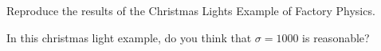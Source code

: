 \begin{exercise}
Reproduce the results of the Christmas Lights Example of Factory Physics.

\end{exercise}

\begin{exercise}
  In this christmas light example, 
do you think that $\sigma = 1000$ is reasonable? 

\end{exercise}


